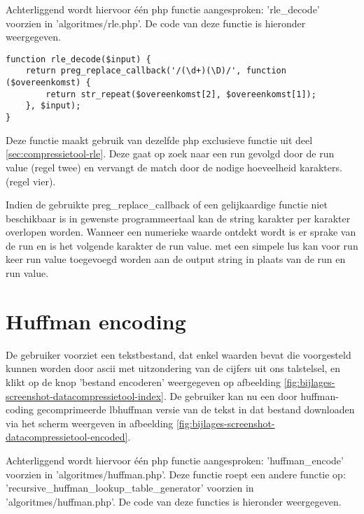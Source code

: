 Achterliggend wordt hiervoor één \gls{php} functie aangesproken: 'rle\_decode' voorzien in 'algoritmes/rle.php'. De code van deze functie is hieronder weergegeven.

\begin{lstlisting}
function rle_decode($input) {
	return preg_replace_callback('/(\d+)(\D)/', function ($overeenkomst) {
		return str_repeat($overeenkomst[2], $overeenkomst[1]);
	}, $input);
}
\end{lstlisting}

Deze functie maakt gebruik van dezelfde \gls{php} exclusieve functie uit deel \ref{sec:compressietool-rle}. Deze gaat op zoek naar een run gevolgd door de run value (regel twee) en vervangt de match door de nodige hoeveelheid karakters. (regel vier).

Indien de gebruikte preg\_replace\_callback of een gelijkaardige functie niet beschikbaar is in gewenste programmeertaal kan de \gls{string} karakter per karakter overlopen worden. Wanneer een numerieke waarde ontdekt wordt is er sprake van de run en is het volgende karakter de run value. met een simpele lus kan voor run keer run value toegevoegd worden aan de output string in plaats van de run en run value.

\section{Huffman encoding}
\label{sec:compressietool-huffman-encoding}

De gebruiker voorziet een tekstbestand, dat enkel waarden bevat die voorgesteld kunnen worden door \gls{ascii} met uitzondering van de cijfers uit ons talstelsel, en klikt op de knop 'bestand encoderen' weergegeven op afbeelding \ref{fig:bijlages-screenshot-datacompressietool-index}. De gebruiker kan nu een door \gls{huffman-coding} gecomprimeerde \gls{lbhuffman} versie van de tekst in dat bestand downloaden via het scherm weergeven in afbeelding \ref{fig:bijlages-screenshot-datacompressietool-encoded}.

Achterliggend wordt hiervoor één \gls{php} functie aangesproken: 'huffman\_encode' voorzien in 'algoritmes/huffman.php'. Deze functie roept een andere functie op: 'recursive\_huffman\_lookup\_table\_generator' voorzien in 'algoritmes/huffman.php'.  De code van deze functies is hieronder weergegeven.


